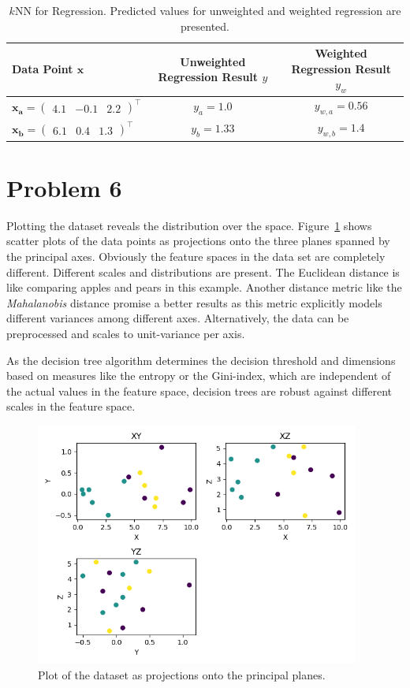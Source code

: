 \documentclass{scrartcl}
\begin{document}
\begin{table}[h]
	\centering

	\begin{tabular}{l|c|c}
	\hline

	\hline
	\textbf{Data Point} $\mathbf{x}$ & \textbf{Unweighted Regression Result} $y$ & \textbf{Weighted Regression Result} $y_w$\\
	\hline
		 $\mathbf{x_a} = \begin{pmatrix}
		 	4.1 & -0.1 & 2.2
		 \end{pmatrix}^\top$& $y_a = 1.0$ & $y_{w,a} = 0.56$\\
	\hline
		$\mathbf{x_b} = \begin{pmatrix}
			6.1 & 0.4 & 1.3
		\end{pmatrix}^\top$ & $y_b = 1.33$ & $y_{w,b} = 1.4$\\

	\hline
	\end{tabular}
	\caption{$k$NN for Regression. Predicted values for unweighted and weighted regression are presented.}
	\label{tab:class_predictions}
\end{table}

\section{Problem 6}
Plotting the dataset reveals the distribution over the space. Figure~\ref{fig:2d} shows scatter plots of the data points as projections onto the three planes spanned by the principal axes. Obviously the feature spaces in the data set are completely different. Different scales and distributions are present. The Euclidean distance is like comparing apples and pears in this example. Another distance metric like the \emph{Mahalanobis} distance promise a better results as this metric explicitly models different variances among different axes. Alternatively, the data can be preprocessed and scales to unit-variance per axis.

As the decision tree algorithm determines the decision threshold and dimensions based on measures like the entropy or the Gini-index, which are independent of the actual values in the feature space, decision trees are robust against different scales in the feature space.


\begin{figure}[h]
	\centering
	\includegraphics[height=8cm]{2d.png}
	\caption{Plot of the dataset as projections onto the principal planes.}
	\label{fig:2d}
\end{figure}


\end{document}
